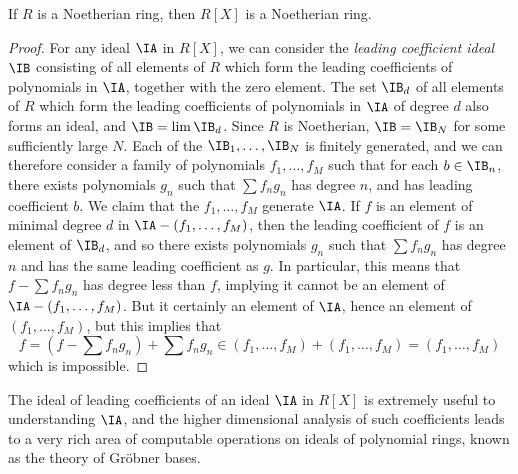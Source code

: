 \begin{theorem}
    If $R$ is a Noetherian ring, then $R[X]$ is a Noetherian ring.
\end{theorem}
\begin{proof}
    For any ideal $\IA$ in $R[X]$, we can consider the {\it leading coefficient ideal} $\IB$ consisting of all elements of $R$ which form the leading coefficients of polynomials in $\IA$, together with the zero element. The set $\IB_d$ of all elements of $R$ which form the leading coefficients of polynomials in $\IA$ of degree $d$ also forms an ideal, and $\IB = \lim \IB_d$. Since $R$ is Noetherian, $\IB = \IB_N$ for some sufficiently large $N$. Each of the $\IB_1, \dots, \IB_N$ is finitely generated, and we can therefore consider a family of polynomials $f_1, \dots, f_M$ such that for each $b \in \IB_n$, there exists polynomials $g_n$ such that $\sum f_n g_n$ has degree $n$, and has leading coefficient $b$. We claim that the $f_1, \dots, f_M$ generate $\IA$. If $f$ is an element of minimal degree $d$ in $\IA - (f_1, \dots, f_M)$, then the leading coefficient of $f$ is an element of $\IB_d$, and so there exists polynomials $g_n$ such that $\sum f_n g_n$ has degree $n$ and has the same leading coefficient as $g$. In particular, this means that $f - \sum f_n g_n$ has degree less than $f$, implying it cannot be an element of $\IA - (f_1, \dots, f_M)$. But it certainly an element of $\IA$, hence an element of $(f_1, \dots, f_M)$, but this implies that
    \[ f = (f - \sum f_n g_n) + \sum f_n g_n \in (f_1, \dots, f_M) + (f_1, \dots, f_M) = (f_1, \dots, f_M) \]
    which is impossible.
\end{proof}

The ideal of leading coefficients of an ideal $\IA$ in $R[X]$ is extremely useful to understanding $\IA$, and the higher dimensional analysis of such coefficients leads to a very rich area of computable operations on ideals of polynomial rings, known as the theory of Gr\"{o}bner bases.

